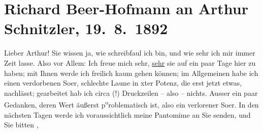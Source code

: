 

         
         \renewcommand{\erwaehntePersonen}{Personen:  ?? [Schreibkraft für Arthur Schnitzler], Richard Beer-Hofmann, Bertha Flegmann, Hugo von Hofmannsthal, Karl Kraus, Felix Salten, Gustav Schwarzkopf}
         \renewcommand{\erwaehnteOrte}{Orte: Bad Ischl, Wien}
         \renewcommand{\erwaehnteWerke}{Werke: Abschiedssouper, Anatols Hochzeitsmorgen, Anfang vom Ende, Das Märchen. Schauspiel in drei Aufzügen, Deutsche Dichtung, Die Frage an das Schicksal, Episode, Pierrot Hypnotiseur}
               \section[Richard Beer-Hofmann an Arthur Schnitzler, 19. 8. 1892]{ Richard Beer-Hofmann an Arthur Schnitzler, 19. 8. 1892}\nopagebreak{}\rehead{ }\begin{ledgroupsized}[t]{13cm}\normalsize\beginnumbering \toendnotes[C]{\smallbreak\pagebreak[2]} 
\toendnotes[C]{\smallbreak}\pstart
           \noindent{}{\pb}Lieber Arthur! Sie wissen ja, wie schreibfaul ich bin, und wie sehr
               ich mir immer Zeit lasse.\pend
           \pstart
           Also vor Allem: Ich freue mich sehr, \uline{sehr} sie auf ein
               paar Tage hier zu haben; mit Ihnen {\pb}werde ich freilich kaum gehen können; im Allgemeinen habe ich einen verdorbenen
                  So{\geminationm}er, schlechte Laune in xter Potenz, die erst jetzt
               etwas, nachlässt; gearbeitet {\pb}hab
               ich circa  (!) Druckzeilen – also – nichts. Ausser
               ein paar Gedanken, deren Wert äußerst p\substVorne{}\textsuperscript{o}\substDazwischen{}ro\substHinten{}blematisch ist, also ein verlorener So{\geminationm}er. In
               den nächsten {\pb}Tagen werde ich
               voraussichtlich meine Pantomime an Sie senden, und Sie bitten ,

\end{ledgroupsized}
